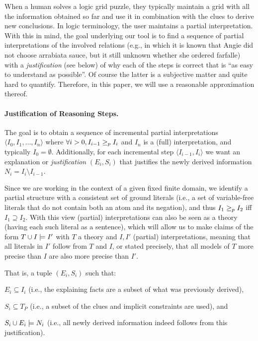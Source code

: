 
When a human solves a logic grid puzzle, they typically maintain a grid with all the information obtained so far and use it in combination with the clues to derive new conclusions. In logic terminology, the user maintains a partial interpretation.  
With this in mind, the goal underlying our tool is to find a sequence of partial interpretations of the involved relations (e.g., in which it is known that Angie did not choose arrabiata sauce, but it still unknown whether she ordered farfalle) with a 
\emph{justification} (see below) of why each of the steps is correct that is ``as easy to understand as possible''. 
Of course the latter is a subjective matter and quite hard to quantify. Therefore, in this paper, we will use a reasonable approximation thereof. 


\paragraph{Justification of Reasoning Steps.}
The goal is to obtain a sequence of incremental partial interpretations $\langle I_0, I_1, \ldots, I_n \rangle$ where $\forall i>0, I_{i-1} \geq_p I_{i}$ and $I_n$ is a (full) interpretation, and typically $I_0 = \emptyset$.
Additionally, for each incremental step $\langle I_{i-1}, I_i \rangle$ we want an explanation or \textit{justification} $(E_i,S_i)$ that justifies the newly derived information $N_i = I_i \setminus I_{i-1}$.

Since we are working in the context of a given fixed finite domain, we identify a partial structure with a consistent set of ground literals (i.e., a set of variable-free literals that do not contain both an atom and its negation), and thus $I_1\geq_p I_2$ iff $I_1\supseteq I_2$.
With this view (partial) interpretations can also be seen as a theory (having each such literal as a sentence), which will allow us to make claims of the form 
$T\cup I \models I'$ with $T$ a theory and  $I,I'$ (partial) interpretations, meaning that all literals in $I'$ follow from $T$ and $I$, or stated precisely, that all models of $T$ more precise than $I$ are also more precise than $I'$. 

That is, a tuple $(E_i,S_i)$ such that: 
\begin{compactitem}
	\item $E_i\subseteq I_i$ (i.e., the explaining facts are a subset of what was previously derived),
	\item $S_i \subseteq T_P$ (i.e., a subset of the clues and implicit constraints are used), and 
	\item $S_i \cup E_i \models N_i$ (i.e., all newly derived information indeed follows from this justification).
\end{compactitem}

